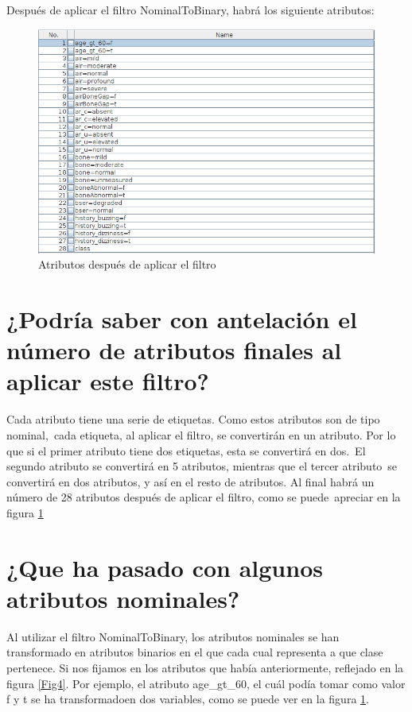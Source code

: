 \documentclass[11pt,twoside,a4paper]{book}
\begin{document}
Después de aplicar el filtro NominalToBinary, habrá los siguiente atributos:

\begin{figure}[H]
	\includegraphics[width=\textwidth]{ejercicio2_1.png}
	\caption{Atributos después de aplicar el filtro}
	\label{Fig5}
\end{figure}

\section{¿Podría saber con antelación el número de atributos finales al aplicar este filtro?}
Cada atributo tiene una serie de etiquetas. Como estos atributos son de tipo nominal,\
cada etiqueta, al aplicar el filtro, se convertirán en un atributo.
Por lo que si el primer atributo tiene dos etiquetas, esta se convertirá en dos.\
El segundo atributo se convertirá en 5 atributos, mientras que el tercer atributo\
se convertirá en dos atributos, y así en el resto de atributos.
Al final habrá un número de 28 atributos después de aplicar el filtro, como se puede\
apreciar en la figura \ref{Fig5}

\section{¿Que ha pasado con algunos atributos nominales?}
Al utilizar el filtro NominalToBinary, los atributos nominales se han transformado
en atributos binarios en el que cada cual representa a que clase pertenece. Si nos
fijamos en los atributos que había anteriormente, reflejado en la figura \ref{Fig4}.
Por ejemplo, el atributo age\_gt\_60, el cuál podía tomar como valor f y t se ha
transformadoen dos variables, como se puede ver en la figura \ref{Fig5}.
\end{document}
